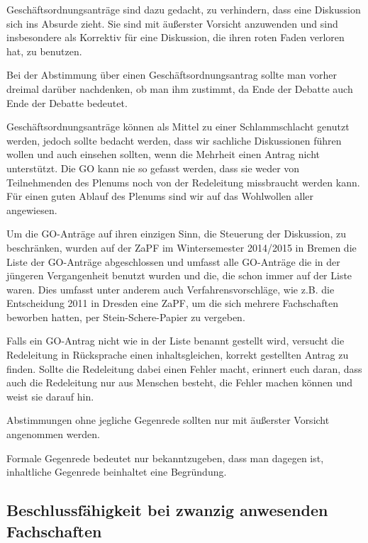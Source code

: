 \documentclass[
  ngerman,
  a4paper,
  oneside]{scrartcl}
\begin{document}
Geschäftsordnungsanträge sind dazu gedacht, zu verhindern, dass eine
Diskussion sich ins Absurde zieht. Sie sind mit äußerster Vorsicht
anzuwenden und sind insbesondere als Korrektiv für eine Diskussion, die
ihren roten Faden verloren hat, zu benutzen.

Bei der Abstimmung über einen Geschäftsordnungsantrag sollte man vorher
dreimal darüber nachdenken, ob man ihm zustimmt, da Ende der Debatte
auch Ende der Debatte bedeutet.

Geschäftsordnungsanträge können als Mittel zu einer Schlammschlacht
genutzt werden, jedoch sollte bedacht werden, dass wir sachliche
Diskussionen führen wollen und auch einsehen sollten, wenn die Mehrheit
einen Antrag nicht unterstützt. Die GO kann nie so gefasst werden, dass
sie weder von Teilnehmenden des Plenums noch von der Redeleitung
missbraucht werden kann. Für einen guten Ablauf des Plenums sind wir auf
das Wohlwollen aller angewiesen.

Um die GO-Anträge auf ihren einzigen Sinn, die Steuerung der Diskussion,
zu beschränken, wurden auf der ZaPF im Wintersemester 2014/2015 in
Bremen die Liste der GO-Anträge abgeschlossen und umfasst alle
GO-Anträge die in der jüngeren Vergangenheit benutzt wurden und die, die
schon immer auf der Liste waren. Dies umfasst unter anderem auch
Verfahrensvorschläge, wie z.B. die Entscheidung 2011 in Dresden eine
ZaPF, um die sich mehrere Fachschaften beworben hatten, per
Stein-Schere-Papier zu vergeben.

Falls ein GO-Antrag nicht wie in der Liste benannt gestellt wird,
versucht die Redeleitung in Rücksprache einen inhaltsgleichen, korrekt
gestellten Antrag zu finden. Sollte die Redeleitung dabei einen Fehler
macht, erinnert euch daran, dass auch die Redeleitung nur aus Menschen
besteht, die Fehler machen können und weist sie darauf hin.

Abstimmungen ohne jegliche Gegenrede sollten nur mit äußerster Vorsicht
angenommen werden.

Formale Gegenrede bedeutet nur bekanntzugeben, dass man dagegen ist,
inhaltliche Gegenrede beinhaltet eine Begründung.

\subsection*{Beschlussfähigkeit bei zwanzig anwesenden
Fachschaften}\label{beschlussfuxe4higkeit-bei-zwanzig-anwesenden-fachschaften}
\end{document}
